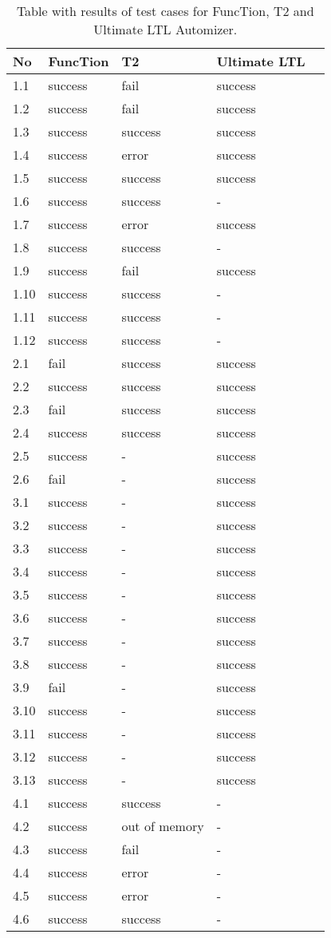 \documentclass[11pt,a4paper,titlepage]{article}
\theoremstyle{definition}
\begin{document}
\begin{table}
\begin{tabular}{l l l l l}
    \textbf{No} & \textbf{FuncTion} & \textbf{T2} & \textbf{Ultimate LTL}  \\
    \hline
    1.1 & success & fail & success \\
    1.2 & success & fail & success \\
    1.3 & success & success & success \\
    1.4 & success & error & success \\
    1.5 & success & success & success \\
    1.6 & success & success & - \\
    1.7 & success & error & success \\
    1.8 & success & success & - \\
    1.9 & success & fail & success \\
    1.10 & success & success & - \\
    1.11 & success & success & - \\
    1.12 & success & success & - \\
    \hline
    2.1 & fail & success & success \\
    2.2 & success & success & success \\
    2.3 & fail & success & success \\
    2.4 & success & success & success \\
    2.5 & success & - & success \\
    2.6 & fail & - & success \\
    \hline
    3.1 & success & - & success \\
    3.2 & success & - & success \\
    3.3 & success & - & success \\
    3.4 & success & - & success \\
    3.5 & success & - & success \\
    3.6 & success & - & success \\
    3.7 & success & - & success \\
    3.8 & success & - & success \\
    3.9 & fail & - & success \\
    3.10 & success & - & success \\
    3.11 & success & - & success \\
    3.12 & success & - & success \\
    3.13 & success & - & success \\
    \hline
    4.1 & success & success & - \\
    4.2 & success & out of memory & - \\
    4.3 & success & fail & - \\
    4.4 & success & error & - \\
    4.5 & success & error & - \\
    4.6 & success & success & - \\
\end{tabular}
\caption{Table with results of test cases for FuncTion, T2 and Ultimate LTL Automizer.}
\label{tbl:test_cases_results}
\end{table}
\end{document}
